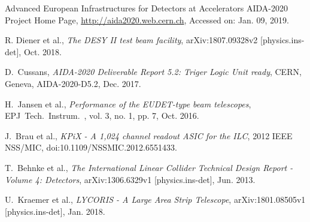 \documentclass[journal]{IEEEtran}
\begin{document}
%
%
%
\begin{thebibliography}{1}



  Advanced European Infrastructures for Detectors at Accelerators AIDA-2020 Project Home Page, \url{http://aida2020.web.cern.ch}, Accessed on: Jan. 09, 2019.

  R. Diener et al., \emph{The DESY II test beam facility},  arXiv:1807.09328v2 [physics.ins-det], Oct. 2018.

  D.~Cussans, \emph{AIDA-2020 Deliverable Report 5.2: Triger Logic Unit ready},
  CERN, Geneva, AIDA-2020-D5.2, Dec. 2017.

  H.~Jansen et al., \emph{Performance of the EUDET-type beam telescopes}, EPJ~Tech.~Instrum.~, vol. 3, no. 1, pp. 7, Oct. 2016.

  J.~Brau et al., \emph{KPiX - A 1,024 channel readout ASIC for the ILC}, 2012 IEEE NSS/MIC, doi:10.1109/NSSMIC.2012.6551433.

  T.~Behnke et al., \emph{The International Linear Collider Technical Design Report - Volume 4: Detectors}, arXiv:1306.6329v1 [physics.ins-det], Jun. 2013.


  U.~Kraemer et al., \emph{LYCORIS - A Large Area Strip Telescope}, arXiv:1801.08505v1 [physics.ins-det], Jan. 2018.



\end{thebibliography}
\end{document}
